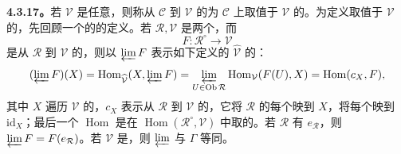 \textbf{4.3.17。}若 $\mathcal V$ 是任意，则称从 $\mathcal C$ 到 $\mathcal V$ 的为 $\mathcal C$ 上取值于 $\mathcal V$ 的。为定义取值于 $\mathcal V$ 的，先回顾一个的的定义。若 $\mathcal R,\mathcal V$ 是两个，而
\[
F:\mathcal R^{\circ}\longrightarrow\mathcal V
\]
是从 $\mathcal R$ 到 $\mathcal V$ 的，则以 $\varprojlim F$ 表示如下定义的 $\widehat{\mathcal V}$ 的：
\[
(\varprojlim F)(X)=\operatorname{Hom}_{\widehat{\mathcal V}}(X,\varprojlim F)
=\varprojlim_{U\in\operatorname{Ob}\mathcal R}\operatorname{Hom}_{\mathcal V}(F(U),X)
=\operatorname{Hom}(c_X,F),
\]
其中 $X$ 遍历 $\mathcal V$ 的，$c_X$ 表示从 $\mathcal R$ 到 $\mathcal V$ 的，它将 $\mathcal R$ 的每个映到 $X$，将每个映到 $\mathrm{id}_X$；最后一个 $\operatorname{Hom}$ 是在 $\operatorname{Hom}(\mathcal R^{\circ},\mathcal V)$ 中取的。若 $\mathcal R$ 有 $e_{\mathcal R}$，则 $\varprojlim F=F(e_{\mathcal R})$。若 $\mathcal V$ 是，则 $\varprojlim$ 与 $\Gamma$ 等同。

